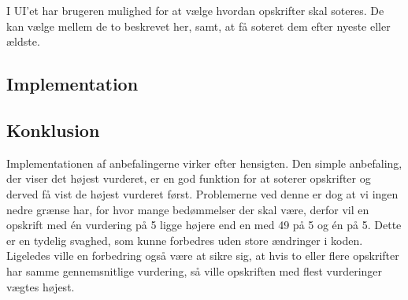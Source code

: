I UI’et har brugeren mulighed for at vælge hvordan opskrifter skal soteres.
De kan vælge mellem de to beskrevet her, samt, at få soteret dem efter nyeste eller ældste.

\subsection{Implementation}


\subsection{Konklusion}
Implementationen af anbefalingerne virker efter hensigten.
Den simple anbefaling, der viser det højest vurderet, er en god funktion for at soterer opskrifter og derved få vist de højest vurderet først.
Problemerne ved denne er dog at vi ingen nedre grænse har, for hvor mange bedømmelser der skal være, derfor vil en opskrift med én vurdering på 5 ligge højere end en med 49 på 5 og én på 5.
Dette er en tydelig svaghed, som kunne forbedres uden store ændringer i koden.
Ligeledes ville en forbedring også være at sikre sig, at hvis to eller flere opskrifter har samme gennemsnitlige vurdering, så ville opskriften med flest vurderinger vægtes højest.
